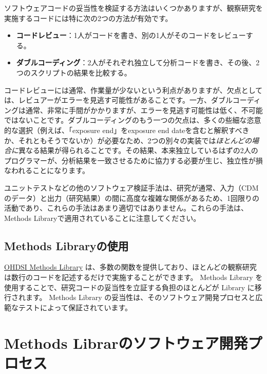 \documentclass[
  11pt]{book}
\theoremstyle{definition}
\theoremstyle{definition}
\theoremstyle{definition}
\theoremstyle{definition}
\theoremstyle{remark}
\begin{document}
ソフトウェアコードの妥当性を検証する方法はいくつかありますが、観察研究を実施するコードには特に次の2つの方法が有効です。

\begin{itemize}
\item
  \textbf{コードレビュー}：1人がコードを書き、別の1人がそのコードをレビューする。
\item
  \textbf{ダブルコーディング}：2人がそれぞれ独立して分析コードを書き、その後、2つのスクリプトの結果を比較する。
\end{itemize}

コードレビューには通常、作業量が少ないという利点がありますが、欠点としては、レビュアーがエラーを見逃す可能性があることです。一方、ダブルコーディングは通常、非常に手間がかかりますが、エラーを見逃す可能性は低く、不可能ではないことです。ダブルコーディングのもう一つの欠点は、多くの些細な恣意的な選択（例えば、「exposure end」をexposure end dateを含むと解釈すべきか、それともそうでないか）が必要なため、2つの別々の実装では\emph{ほとんどの場合に}異なる結果が得られることです。その結果、本来独立しているはずの2人のプログラマーが、分析結果を一致させるために協力する必要が生じ、独立性が損なわれることになります。

ユニットテストなどの他のソフトウェア検証手法は、研究が通常、入力（CDMのデータ）と出力（研究結果）の間に高度な複雑な関係があるため、1回限りの活動であり、これらの手法はあまり適切ではありません。これらの手法は、Methods Libraryで適用されていることに注意してください。

\subsection{Methods Libraryの使用}\label{methods-libraryux306eux4f7fux7528}

\href{https://ohdsi.github.io/MethodsLibrary/}{OHDSI Methods Library} は、多数の関数を提供しており、ほとんどの観察研究は数行のコードを記述するだけで実施することができます。 Methods Library を使用することで、研究コードの妥当性を立証する負担のほとんどが Library に移行されます。 Methods Library の妥当性は、そのソフトウェア開発プロセスと広範なテストによって保証されています。

\section{Methods Librarのソフトウェア開発プロセス}\label{methods-librarux306eux30bdux30d5ux30c8ux30a6ux30a7ux30a2ux958bux767aux30d7ux30edux30bbux30b9}
\end{document}
